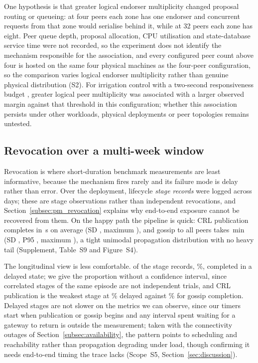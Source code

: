 \documentclass[a4paper,fleqn]{cas-sc}
\begin{document}
One hypothesis is that greater logical endorser multiplicity changed
proposal routing or queueing: at four peers each zone has one endorser and
concurrent requests from that zone would serialise behind it, while at 32
peers each zone has eight. Peer queue depth, proposal allocation, CPU
utilisation and state-database service time were not recorded, so the
experiment does not identify the mechanism responsible for the
association, and every configured peer count above four is hosted on the
same four physical machines as the four-peer configuration, so the
comparison varies logical endorser multiplicity rather than genuine
physical distribution (S2). For irrigation control with a two-second
responsiveness budget \cite{leacox2013wireless}, greater logical peer
multiplicity was associated with a larger observed margin against that
threshold in this configuration; whether this association persists under
other workloads, physical deployments or peer topologies remains
untested.

\subsection{Revocation over a multi-week window}
\label{subsec:revocation}

Revocation is where short-duration benchmark measurements are least
informative, because the mechanism fires rarely and its failure mode is
delay rather than error.
Over the deployment, \RevEvents{} lifecycle \emph{stage records} were
logged across \RevDays{} days; these are stage observations rather than
independent revocations, and Section~\ref{subsec:pm_revocation} explains
why end-to-end exposure cannot be recovered from them. On the happy path
the pipeline is quick: CRL publication completes in \RevPubMean\,s on
average (SD \RevPubSD, maximum \RevPubMax), and gossip to all peers takes
\RevGossipMean\,min (SD \RevGossipSD, P95 \RevGossipPNinetyFive, maximum
\RevGossipMax), a tight unimodal propagation distribution with no heavy
tail (Supplement, Table~S9 and Figure~S4).

The longitudinal view is less comfortable. \RevDelayed{} of the
\RevEvents{} stage records, \RevDelayedPct\%, completed in a delayed
state; we give the proportion without a confidence interval, since
correlated stages of the same episode are not independent trials, and CRL
publication is the weakest stage at \RevWorstTypePct\% delayed against
\RevBestTypePct\% for gossip completion. Delayed stages are not slower on
the metrics we can observe, since our timers start when publication or
gossip begins and any interval spent waiting for a gateway to return is
outside the measurement; taken with the connectivity outages of
Section~\ref{subsec:availability}, the pattern points to scheduling and
reachability rather than propagation degrading under load, though
confirming it needs end-to-end timing the trace lacks (Scope~S5,
Section~\ref{sec:discussion}).
\end{document}
